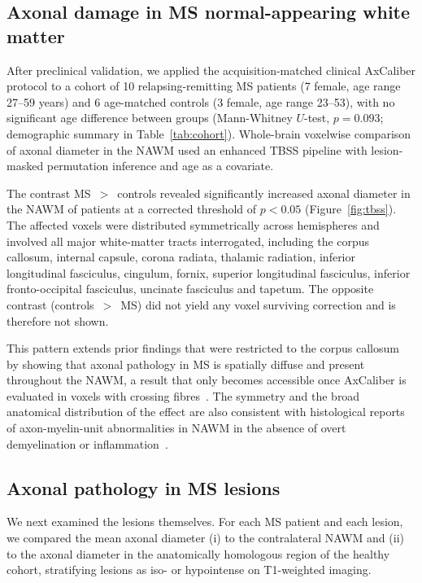 \documentclass[11pt]{article}
\begin{document}
\subsection{Axonal damage in MS normal-appearing white matter}

After preclinical validation, we applied the acquisition-matched clinical AxCaliber protocol to a cohort of 10 relapsing-remitting MS patients (7 female, age range 27--59 years) and 6 age-matched controls (3 female, age range 23--53), with no significant age difference between groups (Mann-Whitney $U$-test, $p=0.093$; demographic summary in Table~\ref{tab:cohort}). Whole-brain voxelwise comparison of axonal diameter in the NAWM used an enhanced TBSS pipeline with lesion-masked permutation inference and age as a covariate.

The contrast MS~$>$~controls revealed significantly increased axonal diameter in the NAWM of patients at a corrected threshold of $p<0.05$ (Figure~\ref{fig:tbss}). The affected voxels were distributed symmetrically across hemispheres and involved all major white-matter tracts interrogated, including the corpus callosum, internal capsule, corona radiata, thalamic radiation, inferior longitudinal fasciculus, cingulum, fornix, superior longitudinal fasciculus, inferior fronto-occipital fasciculus, uncinate fasciculus and tapetum. The opposite contrast (controls~$>$~MS) did not yield any voxel surviving correction and is therefore not shown.

This pattern extends prior findings that were restricted to the corpus callosum~\cite{desantis2019whole} by showing that axonal pathology in MS is spatially diffuse and present throughout the NAWM, a result that only becomes accessible once AxCaliber is evaluated in voxels with crossing fibres~\cite{jeurissen2013investigating}. The symmetry and the broad anatomical distribution of the effect are also consistent with histological reports of axon-myelin-unit abnormalities in NAWM in the absence of overt demyelination or inflammation~\cite{luchicchi2021axonal}.

\subsection{Axonal pathology in MS lesions}

We next examined the lesions themselves. For each MS patient and each lesion, we compared the mean axonal diameter (i) to the contralateral NAWM and (ii) to the axonal diameter in the anatomically homologous region of the healthy cohort, stratifying lesions as iso- or hypointense on T1-weighted imaging.
\end{document}
